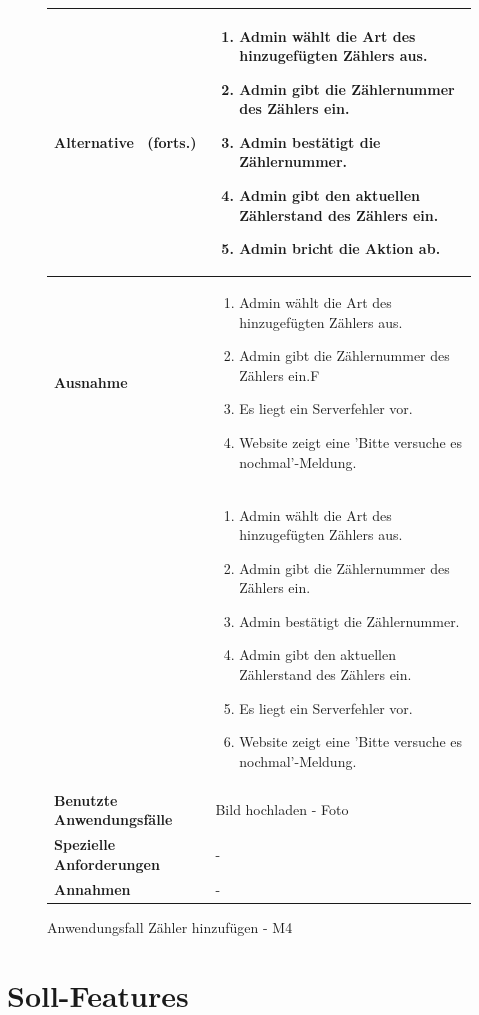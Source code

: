 \begin{figure}[H]
	\centering
	\begin{tabularx}{\textwidth}{ X | X }
	\hline
	\textbf{Alternative} \ (forts.)&
		\begin{enumerate}
			\item Admin wählt die Art des hinzugefügten Zählers aus.
			\item Admin gibt die Zählernummer des Zählers ein.
			\item Admin bestätigt die Zählernummer.
			\item Admin gibt den aktuellen Zählerstand des Zählers ein.
			\item Admin bricht die Aktion ab.
		\end{enumerate} \\ \hline
		\textbf{Ausnahme} & 
		\begin{enumerate}
			\item Admin wählt die Art des hinzugefügten Zählers aus.
			\item Admin gibt die Zählernummer des Zählers ein.F
			\item Es liegt ein Serverfehler vor.
			\item Website zeigt eine 'Bitte versuche es nochmal'-Meldung.
		\end{enumerate} \\ &
		\begin{enumerate}
			\item Admin wählt die Art des hinzugefügten Zählers aus.
			\item Admin gibt die Zählernummer des Zählers ein.
			\item Admin bestätigt die Zählernummer.
			\item Admin gibt den aktuellen Zählerstand des Zählers ein.
			\item Es liegt ein Serverfehler vor.
			\item Website zeigt eine 'Bitte versuche es nochmal'-Meldung.
		\end{enumerate} \\ \hline
		\textbf{Benutzte Anwendungsfälle} & Bild hochladen - Foto \\ \hline
		\textbf{Spezielle Anforderungen} & - \\ \hline
		\textbf{Annahmen} & -
	\end{tabularx}
	\caption{Anwendungsfall Zähler hinzufügen - M4}
	\label{fig:anwendungsfall-server-tabelle-xx-1}
\end{figure}
\newpage

\section{Soll-Features}


